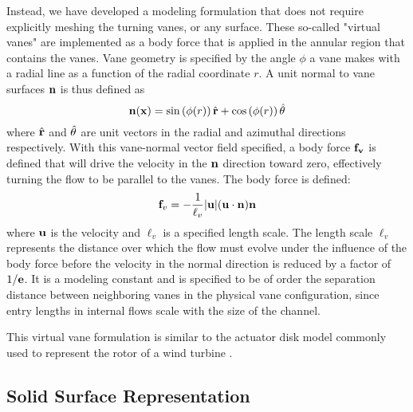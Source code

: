 
Instead, we have developed a modeling formulation that does not require
explicitly meshing the turning vanes, or any surface. These so-called
"virtual vanes" are implemented as a body force that 
is applied in the annular region that contains the vanes. Vane
geometry is specified by the angle $\phi$ a vane makes with a radial
line as a function of the radial coordinate $r$. A unit normal to vane
surfaces ${\bf n}$ is thus defined as
%
\begin{equation}
 {\bf n}({\bf x}) = \sin \left(\phi(r) \right) \hat{{\bf r}}+ \cos \left(\phi(r) \right) \hat{{\bf \theta}}
\end{equation}
%
where $\hat{{\bf r}}$ and $\hat{{\bf \theta}}$ are unit
vectors in the radial and azimuthal directions respectively.
With this vane-normal vector field specified, a body force ${\bf f_v}$
is defined
that will drive the velocity in the ${\bf n}$ direction toward zero,
effectively turning the flow to be parallel to the vanes. The body
force is defined:
\begin{equation}
 {\bf f}_v= -\frac{1}{\ell_v}|{\bf u}|({\bf u}\cdot{\bf n}){\bf n}
 \label{eqn:body_force}
\end{equation}
where ${\bf u}$ is the velocity and $\ell_v$ is a specified length
scale. The length scale $\ell_v$ represents the distance over which the
flow must evolve under the influence of the body force before the
velocity in the normal direction is reduced by a factor of $1/{\bf
e}$. It is a modeling constant and is specified to be of order the
separation distance between neighboring vanes in the physical vane
configuration, since entry lengths in internal flows scale with the
size of the channel.

This virtual vane formulation is similar to the actuator disk model
commonly used to represent the rotor of a wind turbine \cite{betz}.


\subsection{Solid Surface Representation}

